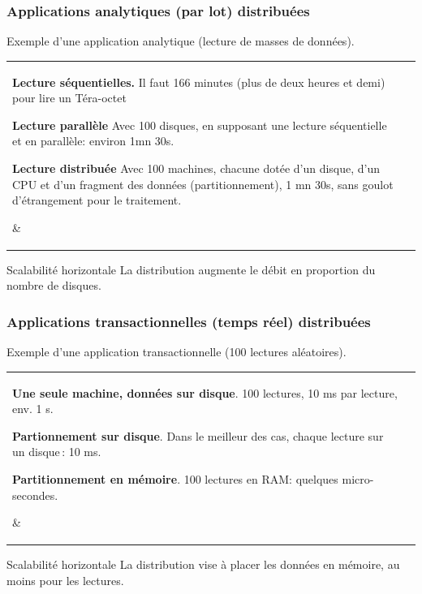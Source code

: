 \begin{frame}
\frametitle{Applications analytiques (par lot) distribuées}

Exemple d'une \alert{application analytique} (lecture de masses de données).

\smallskip

\begin{tabular}{l|p{6cm}}
   \parbox{5cm}{

  \textbf{Lecture séquentielles.}  Il faut 166 minutes (plus de deux heures et demi) pour lire un Téra-octet 
  
  \vfill
  \textbf{Lecture parallèle} Avec 100 disques, en supposant une lecture séquentielle et en parallèle: environ 1mn 30s.
 \vfill
 
 \textbf{Lecture distribuée} Avec 100 machines, chacune dotée d'un disque, d'un CPU et d'un fragment des données (partitionnement),
     1 mn 30s, sans goulot d'étrangement pour le traitement. 
   }  %
  & 
  \parbox{6cm}{ }
\end{tabular}
\vfill

\begin{beamerboxesrounded}{Scalabilité horizontale}
La distribution augmente le débit en proportion du nombre de disques.
\end{beamerboxesrounded}

\end{frame}

\begin{frame}
\frametitle{Applications transactionnelles (temps réel) distribuées}

Exemple d'une \alert{application transactionnelle} (100 lectures aléatoires).

\smallskip


\begin{tabular}{l|p{6cm}}
   \parbox{5cm}{

  \textbf{Une seule machine, données sur disque}. 100 lectures, 10 ms par lecture, env. 1 s.
  
  \vfill
  \textbf{Partionnement sur disque}. Dans le meilleur des cas, chaque lecture sur un disque\,:
     10 ms.
 \vfill
 
 \textbf{Partitionnement en mémoire}. 100 lectures en RAM: quelques micro-secondes. 
   }  %
  & 
  \parbox{6cm}{ }
\end{tabular}
\vfill

\begin{beamerboxesrounded}{Scalabilité horizontale}
La distribution vise à placer les données en mémoire, au moins pour les lectures.
\end{beamerboxesrounded}

\end{frame}


